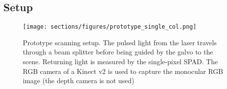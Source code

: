
\subsection{Setup}
\begin{figure}[H]
  \texttt{[image: sections/figures/prototype\_single\_col.png]}
  \caption{Prototype scanning setup. The pulsed light from the laser travels
    through a beam splitter before being guided by the galvo to the scene.
    Returning light is measured by the single-pixel SPAD. The RGB camera of a
    Kinect v2 is used to capture the monocular RGB image (the depth camera is
    not used)}
  \label{fig:prototype}
\end{figure}

